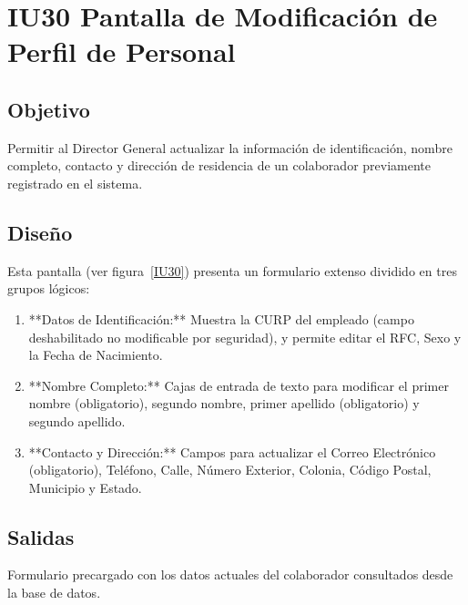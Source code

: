\section{IU30 Pantalla de Modificación de Perfil de Personal}

\subsection{Objetivo}
	Permitir al Director General actualizar la información de identificación, nombre completo, contacto y dirección de residencia de un colaborador previamente registrado en el sistema.

\subsection{Diseño}
	Esta pantalla  (ver figura~\ref{IU30}) presenta un formulario extenso dividido en tres grupos lógicos:
	\begin{enumerate}
		\item **Datos de Identificación:** Muestra la CURP del empleado (campo deshabilitado no modificable por seguridad), y permite editar el RFC, Sexo y la Fecha de Nacimiento.
		\item **Nombre Completo:** Cajas de entrada de texto para modificar el primer nombre (obligatorio), segundo nombre, primer apellido (obligatorio) y segundo apellido.
		\item **Contacto y Dirección:** Campos para actualizar el Correo Electrónico (obligatorio), Teléfono, Calle, Número Exterior, Colonia, Código Postal, Municipio y Estado.
	\end{enumerate}


\subsection{Salidas}
	\begin{Citemize}
		\item Formulario precargado con los datos actuales del colaborador consultados desde la base de datos.
	\end{Citemize}

